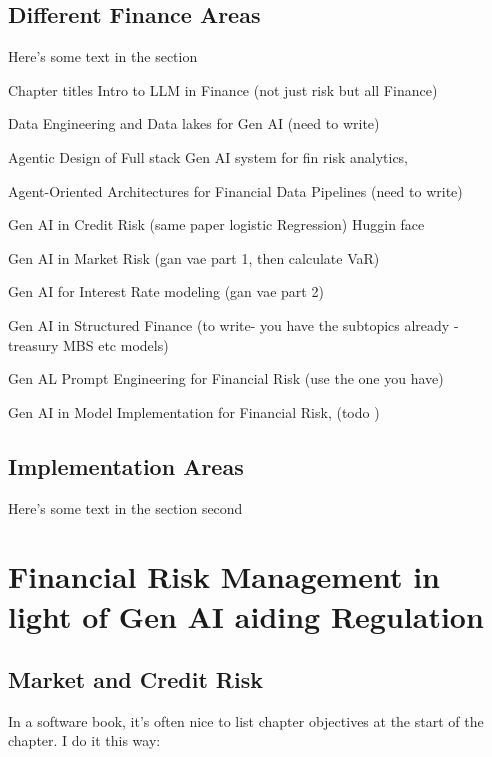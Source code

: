 \documentclass[a4paper,headinclude=on,footinclude=on,12pt,oneside]{scrbook}
\begin{document}
\section{Different Finance Areas}



Here's some text in the section

Chapter titles
Intro to LLM in Finance (not just risk but all Finance) 


Data Engineering and Data lakes for Gen AI (need to write)


Agentic Design of Full stack Gen AI system for fin risk analytics,

Agent-Oriented Architectures for Financial Data Pipelines (need to write) 


Gen AI in Credit Risk (same paper logistic Regression) Huggin face


Gen AI in Market Risk (gan vae part 1, then calculate VaR)


Gen AI for Interest Rate modeling (gan vae part 2)


Gen AI in Structured Finance (to write- you have the subtopics already - treasury MBS etc models)


Gen AL Prompt Engineering for Financial Risk (use the one you have)


Gen AI in Model Implementation for Financial Risk, (todo )


\section{Implementation Areas}

Here's some text in the section second


\chapter{Financial Risk Management in light of Gen AI aiding Regulation}

\section{Market and Credit Risk}

In a software book, it's often nice to list chapter objectives at the start of the chapter. I do it this way:
\end{document}
